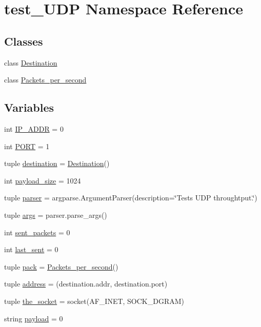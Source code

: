 \hypertarget{namespacetest__UDP}{}\section{test\+\_\+\+U\+D\+P Namespace Reference}
\label{namespacetest__UDP}
\subsection*{Classes}
\begin{DoxyCompactItemize}
\item 
class \hyperlink{classtest__UDP_1_1Destination}{Destination}
\item 
class \hyperlink{classtest__UDP_1_1Packets__per__second}{Packets\+\_\+per\+\_\+second}
\end{DoxyCompactItemize}
\subsection*{Variables}
\begin{DoxyCompactItemize}
\item 
int \hyperlink{namespacetest__UDP_a926edbf6ea365e960fd6e9bba4e5284d}{I\+P\+\_\+\+A\+D\+D\+R} = 0
\item 
int \hyperlink{namespacetest__UDP_a71a28a5e1d87bb9d20b4860f8c1ae9e5}{P\+O\+R\+T} = 1
\item 
tuple \hyperlink{namespacetest__UDP_a3c2d6964266d3f08f1d35ced19d07e69}{destination} = \hyperlink{classtest__UDP_1_1Destination}{Destination}()
\item 
int \hyperlink{namespacetest__UDP_acea780f1c19f5b55cfc6600c36709e50}{payload\+\_\+size} = 1024
\item 
tuple \hyperlink{namespacetest__UDP_a7537a713586823b178eb1a1ef12ef497}{parser} = argparse.\+Argument\+Parser(description=\char`\"{}Tests U\+D\+P throughtput.\char`\"{})
\item 
tuple \hyperlink{namespacetest__UDP_aece376f1baf3191e9fadff2862fc6146}{args} = parser.\+parse\+\_\+args()
\item 
int \hyperlink{namespacetest__UDP_adb04d009f2831eafc2dd425da9037702}{sent\+\_\+packets} = 0
\item 
int \hyperlink{namespacetest__UDP_a5d7f02fdec28b4a2af6d80dde2c76ca2}{last\+\_\+sent} = 0
\item 
tuple \hyperlink{namespacetest__UDP_a76aeca11133e21594b834905047fe718}{pack} = \hyperlink{classtest__UDP_1_1Packets__per__second}{Packets\+\_\+per\+\_\+second}()
\item 
tuple \hyperlink{namespacetest__UDP_ac79f6ba2278e57b7a02d57bc3e9fdf02}{address} = (destination.\+addr, destination.\+port)
\item 
tuple \hyperlink{namespacetest__UDP_a03630c1b0548a6558e82b970aed36de1}{the\+\_\+socket} = socket(A\+F\+\_\+\+I\+N\+E\+T, S\+O\+C\+K\+\_\+\+D\+G\+R\+A\+M)
\item 
string \hyperlink{namespacetest__UDP_a9635e7f3684244fc143d7aa65615e8d9}{payload} = \textquotesingle{}0\textquotesingle{}
\end{DoxyCompactItemize}


